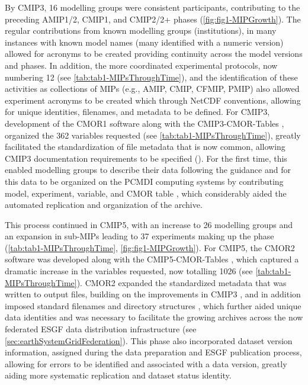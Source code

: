 \documentclass[gmd, preprint]{copernicus}
\begin{document}
By CMIP3, 16 modelling groups were consistent participants, contributing to the preceding AMIP1/2, CMIP1, and CMIP2/2+ phases (\autoref{fig:fig1-MIPGrowth}). The regular contributions from known modelling groups (institutions), in many instances with known model names (many identified with a numeric version) allowed for acronyms to be created providing continuity across the model versions and phases. In addition, the more coordinated experimental protocols, now numbering 12 (see \autoref{tab:tab1-MIPsThroughTime}), and the identification of these activities as collections of MIPs (e.g., AMIP, CMIP, CFMIP, PMIP) also allowed experiment acronyms to be created which through NetCDF conventions, allowing for unique identities, filenames, and metadata to be defined. For CMIP3, development of the CMOR1 software \citep{taylor_cmor_2006} along with the CMIP3-CMOR-Tables \citep{doutriaux_cmip3_2005}, organized the 362 variables requested (see \autoref{tab:tab1-MIPsThroughTime}), greatly facilitated the standardization of file metadata that is now common, allowing CMIP3 documentation requirements to be specified (\citet{taylor_pcmdi_2005}). For the first time, this enabled modelling groups to describe their data following the guidance and for this data to be organized on the PCMDI computing systems by contributing model, experiment, variable, and CMOR table \citep{doutriaux_cmip3_2005}, which considerably aided the automated replication and organization of the archive.

This process continued in CMIP5, with an increase to 26 modelling groups and an expansion in sub-MIPs leading to 37 experiments making up the phase (\autoref{tab:tab1-MIPsThroughTime}, \autoref{fig:fig1-MIPGrowth}).  For CMIP5, the CMOR2 software was developed \citep{doutriaux_cmor_2011} along with the CMIP5-CMOR-Tables \citep{doutriaux_cmip5_2013}, which captured a dramatic increase in the variables requested, now totalling 1026 (see \autoref{tab:tab1-MIPsThroughTime}). CMOR2 expanded the standardized metadata that was written to output files, building on the improvements in CMIP3 \citep{taylor_pcmdi_2010}, and in addition imposed standard filenames and directory structures \citep{taylor_pcmdi_2012}, which further aided unique data identities and was necessary to facilitate the growing archives across the now federated ESGF data distribution infrastructure (see \autoref{sec:earthSystemGridFederation}). This phase also incorporated dataset version information, assigned during the data preparation and ESGF publication process, allowing for errors to be identified and associated with a data version, greatly aiding more systematic replication and dataset status identity. 
\end{document}
